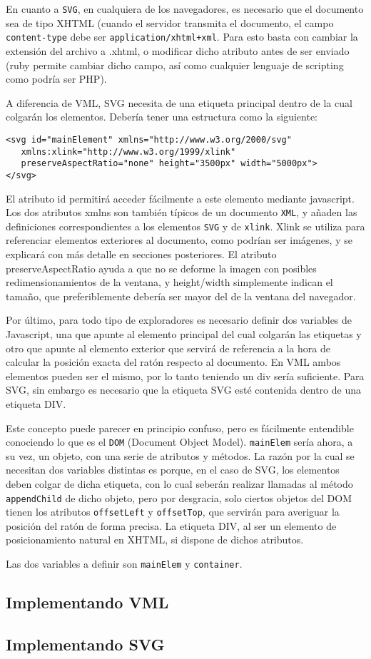 En cuanto a \texttt{SVG}, en cualquiera de los navegadores, es necesario que el documento sea de tipo XHTML (cuando el servidor transmita el documento, el campo \texttt{content-type} debe ser \texttt{application/xhtml+xml}. Para esto basta con cambiar la extensión del archivo a .xhtml, o modificar dicho atributo antes de ser enviado (ruby permite cambiar dicho campo, así como cualquier lenguaje de scripting como podría ser PHP). 

A diferencia de VML, SVG necesita de una etiqueta principal dentro de la cual colgarán los elementos. Debería tener una estructura como la siguiente:

\begin{verbatim}
<svg id="mainElement" xmlns="http://www.w3.org/2000/svg" 
   xmlns:xlink="http://www.w3.org/1999/xlink" 
   preserveAspectRatio="none" height="3500px" width="5000px">
</svg>
\end{verbatim}

El atributo id permitirá acceder fácilmente a este elemento mediante javascript. Los dos atributos xmlns son también típicos de un documento \texttt{XML}, y añaden las definiciones correspondientes a los elementos \texttt{SVG} y de \texttt{xlink}. Xlink se utiliza para referenciar elementos exteriores al documento, como podrían ser imágenes, y se explicará con más detalle en secciones posteriores. El atributo preserveAspectRatio ayuda a que no se deforme la imagen con posibles redimensionamientos de la ventana, y height/width simplemente indican el tamaño, que preferiblemente debería ser mayor del de la ventana del navegador.

Por último, para todo tipo de exploradores es necesario definir dos variables de Javascript, una que apunte al elemento principal del cual colgarán las etiquetas y otro que apunte al elemento exterior que servirá de referencia a la hora de calcular la posición exacta del ratón respecto al documento. En VML ambos elementos pueden ser el mismo, por lo tanto teniendo un div sería suficiente. Para SVG, sin embargo es necesario que la etiqueta SVG esté contenida dentro de una etiqueta DIV.

Este concepto puede parecer en principio confuso, pero es fácilmente entendible conociendo lo que es el \texttt{DOM} (Document Object Model).
\texttt{mainElem} sería ahora, a su vez, un objeto, con una serie de atributos y métodos. La razón por la cual se necesitan dos variables distintas es porque, en el caso de SVG, los elementos deben colgar de dicha etiqueta, con lo cual seberán realizar llamadas al método \texttt{appendChild} de dicho objeto, pero por desgracia, solo ciertos objetos del DOM tienen los atributos \texttt{offsetLeft} y \texttt{offsetTop}, que servirán para averiguar la posición del ratón de forma precisa. La etiqueta DIV, al ser un elemento de posicionamiento natural en XHTML, si dispone de dichos atributos. 

Las dos variables a definir son \texttt{mainElem} y \texttt{container}.

\subsection{Implementando VML}



\subsection{Implementando SVG}

